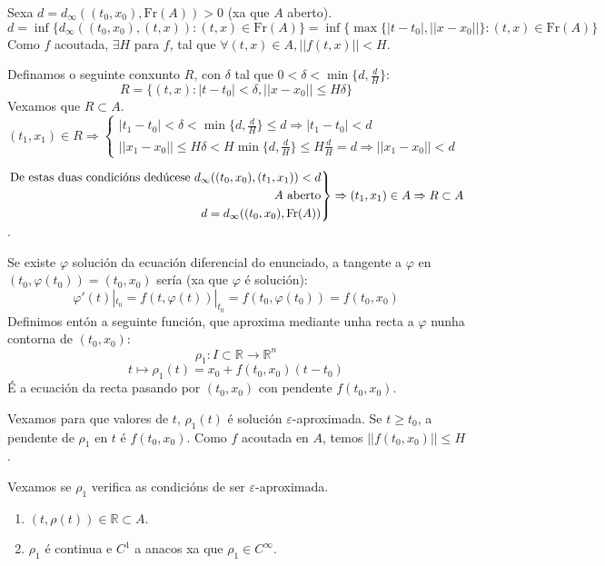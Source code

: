\documentclass[11pt, a4paper,twoside]{article}
\makeatletter
\theoremstyle{theorem-style}  %
\renewenvironment{proof}[1][\proofname]{\par
	\pushQED{\qed}%
	\normalfont \topsep6\p@\@plus6\p@\relax
	\list{}{%
		\settowidth{\leftmargin}{\quad:\hskip\labelsep}%
		\setlength{\labelwidth}{0pt}%
		\setlength{\itemindent}{-\leftmargin}%
	}%
	\item[\hskip\labelsep\itshape#1\@addpunct{:}]\ignorespaces
}{%
	\popQED\endlist\@endpefalse
}
\theoremstyle{definition-style}
\theoremstyle{example-style}
\newenvironment{rcases}
{\left.\begin{aligned}}
	{\end{aligned}\right\rbrace}
\makeatother
\begin{document}
\begin{proof}
	Sexa $ d=d_\infty((t_0, x_0), \text{Fr} (A))>0 $ (xa que $ A $ aberto).
	\[ d=\inf \{d_\infty ( (t_0,x_0), (t,x)):(t,x)\in \text{Fr} (A) \}=\inf \{\max \{|t-t_0|,||x-x_0||\}:(t,x)\in \text{Fr} (A)\}\]
	Como $ f $ acoutada, $ \exists H $ para $ f $, tal que $ \forall(t,x) \in A, ||f(t,x)||<H $.
	
	Definamos o seguinte conxunto $ R $, con $ \delta $ tal que $ 0<\delta<\min \{d, \frac{d}{H}\} $:
	\[ R=\{(t,x):|t-t_0|<\delta, ||x-x_0||\leq H\delta\} \]
	Vexamos que $ R \subset A $. $ (t_1,x_1)\in R \Rightarrow \begin{cases}
	|t_1-t_0|<\delta<\min\{d,\frac{d}{H}\}\leq d\Rightarrow |t_1-t_0|<d\\
	||x_1-x_0||\leq H\delta<H\min\{d,\frac{d}{H}\}\leq H \frac{d}{H}=d \Rightarrow ||x_1-x_0||<d
	\end{cases}$  
	
	$\begin{rcases}
	\text{De estas duas condicións dedúcese } d_\infty ( (t_0,x_0), (t_1,x_1)) <d\\
	A \text{ aberto}\\
	d=d_\infty((t_0, x_0), \text{Fr} (A))
	\end{rcases} \Rightarrow (t_1,x_1)\in A \Rightarrow R \subset A$.
	
	Se existe $ \varphi $ solución da ecuación diferencial do enunciado, a tangente a $ \varphi $ en $ (t_0,\varphi(t_0))=(t_0,x_0) $ sería (xa que $ \varphi $ é solución):
	\[ \varphi'(t)|_{t_0}=f(t, \varphi(t))|_{t_0}=f(t_0,\varphi (t_0))=f(t_0,x_0) \]
	Definimos entón a seguinte función, que aproxima mediante unha recta a $ \varphi $ nunha contorna de $ (t_0,x_0) $: 
	\[ \rho_1:I\subset \mathbb{R}\longrightarrow \mathbb{R}^n \]
	\[ t \mapsto \rho_1(t)=x_0+f(t_0,x_0)(t-t_0) \]
	É a ecuación da recta pasando por $ (t_0,x_0) $ con pendente $ f(t_0,x_0) $.
	
	Vexamos para que valores de $ t $, $ \rho_1(t) $ é solución $ \varepsilon $-aproximada. 
	Se $ t\geq t_0 $, a pendente de $ \rho_1 $ en $ t $ é $ f(t_0,x_0) $.
	Como $ f $ acoutada en $ A $, temos $ ||f(t_0,x_0)||\leq H $.
	
	Vexamos se $ \rho_1 $ verifica as condicións de ser $ \varepsilon $-aproximada.
	\begin{enumerate}[\qquad i)]
		\item  $ (t,\rho(t)) \in \mathbb{R}\subset A$.
		
		\item $ \rho_1 $ é continua e $ C^1 $ a anacos xa que $ \rho_1 \in C^\infty $.
		

\end{enumerate}
\end{proof}
\end{document}
